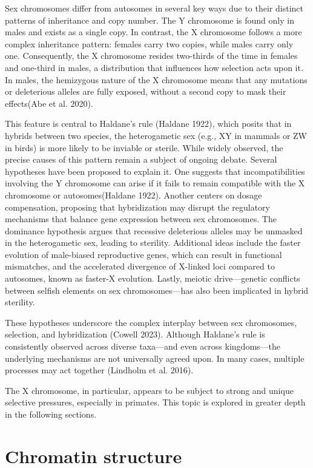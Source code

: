 \documentclass[
  a4paper,
  openany]{scrbook}
\begin{document}
Sex chromosomes differ from autosomes in several key ways due to their
distinct patterns of inheritance and copy number. The Y chromosome is
found only in males and exists as a single copy. In contrast, the X
chromosome follows a more complex inheritance pattern: females carry two
copies, while males carry only one. Consequently, the X chromosome
resides two-thirds of the time in females and one-third in males, a
distribution that influences how selection acts upon it. In males, the
hemizygous nature of the X chromosome means that any mutations or
deleterious alleles are fully exposed, without a second copy to mask
their effects(Abe et al. 2020).

This feature is central to Haldane's rule (Haldane 1922), which posits
that in hybrids between two species, the heterogametic sex (e.g., XY in
mammals or ZW in birds) is more likely to be inviable or sterile. While
widely observed, the precise causes of this pattern remain a subject of
ongoing debate. Several hypotheses have been proposed to explain it. One
suggests that incompatibilities involving the Y chromosome can arise if
it fails to remain compatible with the X chromosome or autosomes(Haldane
1922). Another centers on dosage compensation, proposing that
hybridization may disrupt the regulatory mechanisms that balance gene
expression between sex chromosomes. The dominance hypothesis argues that
recessive deleterious alleles may be unmasked in the heterogametic sex,
leading to sterility. Additional ideas include the faster evolution of
male-biased reproductive genes, which can result in functional
mismatches, and the accelerated divergence of X-linked loci compared to
autosomes, known as faster-X evolution. Lastly, meiotic drive---genetic
conflicts between selfish elements on sex chromosomes---has also been
implicated in hybrid sterility.

These hypotheses underscore the complex interplay between sex
chromosomes, selection, and hybridization (Cowell 2023). Although
Haldane's rule is consistently observed across diverse taxa---and even
across kingdoms---the underlying mechanisms are not universally agreed
upon. In many cases, multiple processes may act together (Lindholm et
al. 2016).

The X chromosome, in particular, appears to be subject to strong and
unique selective pressures, especially in primates. This topic is
explored in greater depth in the following sections.

\section{Chromatin structure}\label{chromatin-structure}
\end{document}
